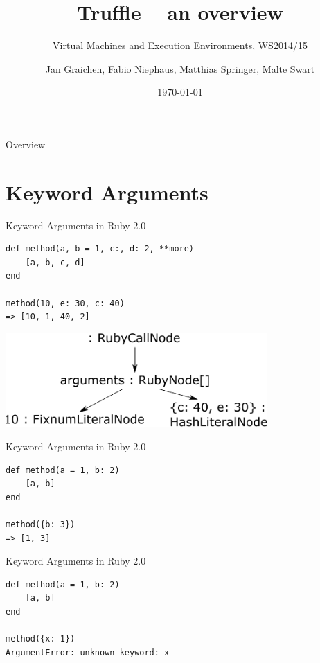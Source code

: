 \documentclass[xcolor=dvipsname,handout]{beamer} %
\title{Truffle -- an overview}
\subtitle{Virtual Machines and Execution Environments, WS2014/15}
\author{Jan Graichen, Fabio Niephaus, Matthias Springer, Malte Swart}
\date{\today}
\institute[2012]{Hasso Plattner Institute, Software Architecture Group}
\begin{document}
\begin{frame}[plain]
	\maketitle
\end{frame}
\begin{frame}{Overview}
	\tableofcontents[hideallsubsections]
\end{frame}

\section{Keyword Arguments}

\begin{frame}[fragile]{Keyword Arguments in Ruby 2.0}
\begin{lstlisting}
def method(a, b = 1, c:, d: 2, **more)
    [a, b, c, d]
end

method(10, e: 30, c: 40)
=> [10, 1, 40, 2]
\end{lstlisting}

\begin{table}
    \centering
    \includegraphics[width=0.75\textwidth]{kwarg_1.pdf}
\end{table}
\end{frame}

\begin{frame}[fragile]{Keyword Arguments in Ruby 2.0}
\begin{lstlisting}
def method(a = 1, b: 2)
    [a, b]
end

method({b: 3})
=> [1, 3]
\end{lstlisting}
\end{frame}

\begin{frame}[fragile]{Keyword Arguments in Ruby 2.0}
\begin{lstlisting}
def method(a = 1, b: 2)
    [a, b]
end

method({x: 1})
ArgumentError: unknown keyword: x
\end{lstlisting}
\end{frame}
\end{document}
